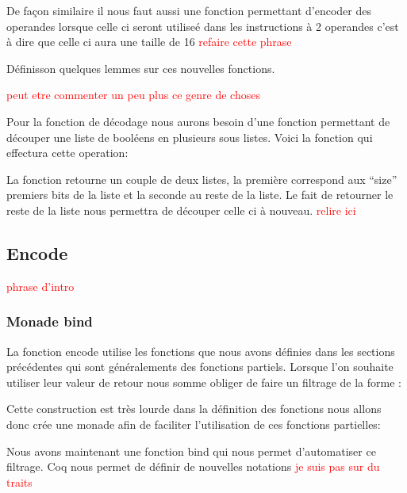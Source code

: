 \documentclass {article}
\newcommand{\codefrom}[3]
           {}
\theoremstyle{definition}
\theoremstyle{remark}
\newcommand{\todo}[1]{\textcolor{red}{#1}}
\begin{document}
\codefrom{src}{encode}{operand_to_bin}

De façon similaire il nous faut aussi une fonction permettant d'encoder des operandes lorsque celle ci seront utiliseé dans
les instructions à 2 operandes c'est à dire que celle ci aura une taille de 16 \todo{refaire cette phrase}

\codefrom{src}{encode}{operand_to_bin_double}

Définisson quelques lemmes sur ces nouvelles fonctions.
\codefrom{src}{encode}{operand_to_bin_hypothesis_reg}
\codefrom{src}{encode}{operand_to_bin_hypothesis_imm}
\codefrom{src}{encode}{operand_to_bin_size}
\todo{peut etre commenter un peu plus ce genre de choses}


Pour la fonction de décodage nous aurons besoin d'une fonction permettant de découper
une liste de booléens en plusieurs sous listes. Voici la fonction qui effectura cette operation:

\codefrom{src}{encode}{get_first_n_bit}

La fonction retourne un couple de deux listes, la première correspond aux ``size'' premiers
bits de la liste et la seconde au reste  de la liste. Le fait de retourner le reste de la liste
nous permettra de découper celle ci à nouveau.
\todo{relire ici}




\subsection{Encode}

\todo{phrase d'intro}

\subsubsection{Monade bind}

La fonction encode utilise les fonctions que nous avons définies dans les sections précédentes qui sont généralements
des fonctions partiels. Lorsque l'on souhaite utiliser leur valeur de retour nous somme obliger de faire un
filtrage de la forme :

\codefrom{rapport}{definitions}{pattern_matching}

Cette construction est très lourde dans la définition des fonctions nous allons donc crée une monade
afin de faciliter l'utilisation de ces fonctions partielles:

\codefrom{src}{encode}{monade}

Nous avons maintenant une fonction bind qui nous permet d'automatiser ce filtrage. Coq nous permet de
définir de nouvelles notations \todo{je suis pas sur du traits}
\end{document}
